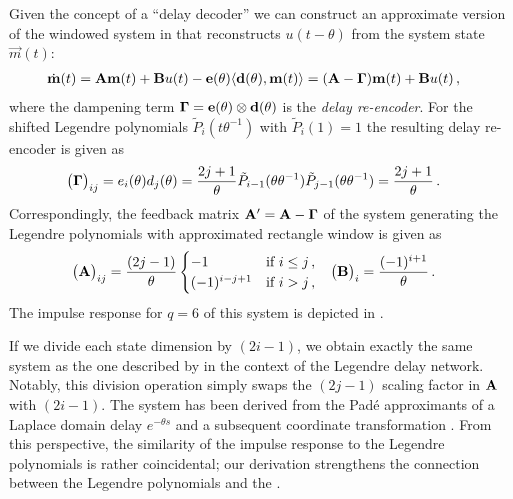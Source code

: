 Given the concept of a \enquote{delay decoder} we can construct an approximate version of the windowed \LTI system in  that reconstructs $u(t - \theta)$ from the system state $\vec m(t)$:
\begin{align}
	\dot{\mathbf{m}}(t)
		&= \mathbf{A} \mathbf{m}(t) + \mathbf{B} u(t) - \mathbf{e}(\theta) \langle \mathbf{d}(\theta), \mathbf{m}(t) \rangle
		 = (\mathbf{A} - \mathbf{\Gamma}) \mathbf{m}(t) + \mathbf{B} u(t)
	\label{eqn:information_erasure_approx} \,,
\end{align}
where the dampening term $\mathbf{\Gamma} = \mathbf{e}(\theta) \otimes \mathbf{d}(\theta)$ is the \emph{delay re-encoder}.
For the shifted Legendre polynomials $\tilde P_i(t \theta^{-1})$ with $\tilde P_i(1) = 1$ the resulting delay re-encoder is given as
\begin{align}
	\big( \mathbf{\Gamma} \big)_{ij} &= e_i(\theta) d_j(\theta) = \frac{2j + 1}{\theta} \tilde P_{i - 1}(\theta \theta^{-1}) \tilde P_{j - 1}(\theta \theta^{-1}) = \frac{2j + 1}{\theta} \,.
	\label{eqn:legendre_delay_reencoder}
\end{align}
Correspondingly, the feedback matrix $\mathbf{A}' = \mathbf{A} - \mathbf{\Gamma}$ of the \LTI system generating the Legendre polynomials with approximated rectangle window is given as
\begin{align}
	\big( \mathbf{A} \big)_{ij} &= \frac{(2j - 1)}{\theta} \begin{cases}
		-1 & \text{if } i \leq j \,, \\
		(-1)^{i - j + 1} & \text{if } i > j  \,,\\
	\end{cases} &
	\big( \mathbf{B} \big)_i &= \frac{(-1)^{i + 1}}{\theta} \,.
	\label{eqn:ldn_system}
\end{align}
The impulse response for $q = 6$ of this system is depicted in .

If we divide each state dimension by $(2 i - 1)$, we obtain exactly the same system as the one described by \citet[Section 6.3.1, pp.~133-135]{voelker2019} in the context of the Legendre delay network.
Notably, this division operation simply swaps the $(2 j - 1)$ scaling factor in $\mathbf{A}$ with $(2 i - 1)$.
The \LDN system has been derived from the Padé approximants of a Laplace domain delay $e^{-\theta s}$ and a subsequent coordinate transformation \citep{voelker2019}.
From this perspective, the similarity of the impulse response to the Legendre polynomials is rather coincidental; our derivation strengthens the connection between the Legendre polynomials and the \LDN.


